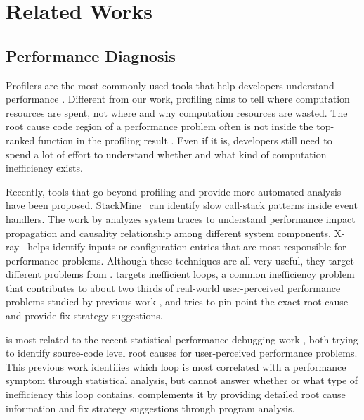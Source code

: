\section{Related Works}
\label{sec:related}

\subsection{Performance Diagnosis}
Profilers are the most commonly used tools that help developers understand
performance
\cite{Zaparanuks:2012:AP:2254064.2254074,Coppa:2012:IP:2254064.2254076,
D'Elia:2011:MHC:1993498.1993559, 
Mytkowicz:2010:EAJ:1806596.1806618,
Ravindranath:2012:AMA:2387880.2387891,
Jovic:2011:CMY:2048066.2048081,IntroPerf}.
Different from our work, profiling aims to tell where 
computation resources are spent, 
not where and why computation resources are wasted. 
The root cause code region of a performance problem often is not inside
the top-ranked function in the profiling result \cite{SongOOPSLA2014}.
Even if it is, developers still need to spend a lot of effort to understand
whether and what kind of computation inefficiency exists.

Recently, tools that go beyond profiling and provide more automated analysis
have been proposed.
StackMine~\cite{Han:2012:PDL:2337223.2337241} can
identify slow call-stack patterns inside event handlers. The work by
\citet{TaoAsplos2014} analyzes system traces to understand 
performance impact propagation and 
causality relationship among different system components. 
X-ray~\cite{Attariyan:2012:XAR:2387880.2387910} helps identify inputs
or configuration entries that are most responsible for performance problems.
Although these techniques are all very useful, 
they target different problems from \Tool. \Tool targets 
inefficient loops, a common
inefficiency problem that contributes to
about two thirds of real-world user-perceived performance problems studied
by previous work \cite{SongOOPSLA2014}, and tries to pin-point the exact
root cause and provide fix-strategy suggestions.

\Tool is most related to
the recent statistical performance debugging work
\citep{SongOOPSLA2014}, both trying to identify source-code level root causes
for user-perceived performance problems. 
This previous work identifies which loop is most correlated with 
a performance symptom through statistical analysis, 
but cannot answer whether or 
what type of inefficiency this loop contains.
\Tool complements it by
providing detailed root cause information and fix strategy suggestions through
program analysis. 

